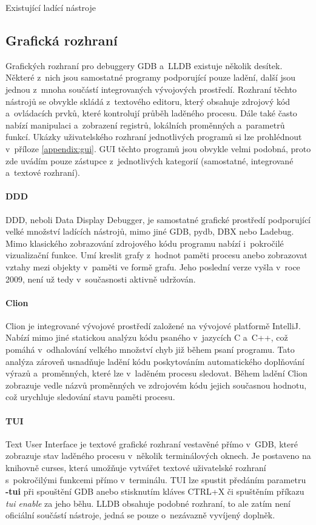 \documentclass[czech,bachelor,male,python,dept460,hidelinks]{diploma}						%
\begin{document}
\begin{section}{Existující ladící nástroje}
	\subsection{Grafická rozhraní}
		Grafických rozhraní pro debuggery GDB a~LLDB existuje několik desítek. Některé z~nich jsou samostatné programy podporující pouze ladění, další jsou
		jednou z~mnoha součástí integrovaných vývojových prostředí. Rozhraní těchto nástrojů se obvykle skládá z~textového editoru, který obsahuje zdrojový kód
		a~ovládacích prvků, které kontrolují průběh laděného procesu. Dále také často nabízí manipulaci a~zobrazení registrů, lokálních proměnných a~parametrů
		funkcí. Ukázky uživatelského rozhraní jednotlivých programů si lze prohlédnout v~příloze \ref{appendix:gui}. GUI těchto programů jsou obvykle velmi
		podobná, proto zde uvádím pouze zástupce z~jednotlivých kategorií (samostatné, integrované a~textové rozhraní).

		\paragraph*{DDD}
			DDD, neboli Data Display Debugger, je samostatné grafické prostředí podporující velké množství ladících nástrojů, mimo jiné GDB, pydb, DBX nebo Ladebug.
			Mimo klasického zobrazování zdrojového kódu programu nabízí i~pokročilé vizualizační funkce. Umí kreslit grafy z~hodnot paměti procesu
			anebo zobrazovat vztahy mezi objekty v~paměti ve formě grafu. Jeho poslední verze vyšla v~roce 2009, není už tedy v~současnosti aktivně udržován.
		\paragraph*{Clion}
		\label{ref:clion}
			Clion je integrované vývojové prostředí založené na vývojové platformě IntelliJ. Nabízí mimo jiné statickou analýzu kódu psaného v~jazycích
			C a~C++, což pomáhá v~odhalování velkého množství chyb již během psaní programu. Tato analýza zároveň usnadňuje ladění kódu poskytováním
			automatického doplňování výrazů a~proměnných, které lze v~laděném procesu sledovat. Během ladění Clion zobrazuje vedle názvů proměnných
			ve zdrojovém kódu jejich současnou hodnotu, což urychluje sledování stavu paměti procesu.
		\paragraph*{TUI}
			Text User Interface je textové grafické rozhraní vestavěné přímo v~GDB, které zobrazuje stav laděného procesu v~několik terminálových oknech.
			Je postaveno na knihovně curses, která umožňuje vytvářet textové uživatelské rozhraní s~pokročilými funkcemi přímo v~terminálu.
			TUI lze spustit předáním parametru \textbf{-tui} při spouštění GDB anebo stisknutím kláves CTRL+X či spuštěním příkazu \emph{tui enable} za jeho běhu.
			LLDB obsahuje podobné rozhraní, to ale zatím není oficiální součástí nástroje, jedná se pouze o~nezávazně vyvíjený doplněk.
\end{section}
\end{document}

